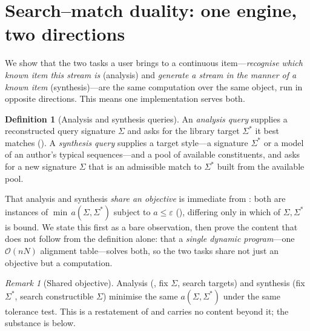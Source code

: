 \documentclass[11pt,twocolumn,a4paper]{article}
\theoremstyle{thmstyle}
\theoremstyle{definition}
\newtheorem{definition}[theorem]{Definition}
\theoremstyle{remark}
\newtheorem{remark}[theorem]{Remark}
\newcommand{\sig}{\Sigma}
\newcommand{\algn}{a}
\newcommand{\eps}{\varepsilon}
\newcommand{\bigOh}{\mathcal{O}}
\begin{document}
\section{Search--match duality: one engine, two directions}
\label{sec:duality}

We show that the two tasks a user brings to a continuous item---\emph{recognise
which known item this stream is} (analysis) and \emph{generate a stream in the
manner of a known item} (synthesis)---are the same computation over the same
object, run in opposite directions. This means one implementation serves both.

\begin{definition}[Analysis and synthesis queries]
\label{def:queries}
An \emph{analysis query} supplies a reconstructed query signature $\sig$ and asks
for the library target $\sig^{\ast}$ it best matches ().
A \emph{synthesis query} supplies a target style---a signature $\sig^{\ast}$ or a
model of an author's typical sequences---and a pool of available constituents,
and asks for a new signature $\sig$ that is an admissible match to $\sig^{\ast}$
built from the available pool.
\end{definition}

That analysis and synthesis \emph{share an objective} is immediate from
: both are instances of $\min\,\algn(\sig,\sig^{\ast})$
subject to $\algn\le\eps$ (), differing only in which of
$\sig,\sig^{\ast}$ is bound. We state this first as a bare observation, then
prove the content that does not follow from the definition alone: that a
\emph{single dynamic program}---one $\bigOh(nN)$ alignment table---solves both,
so the two tasks share not just an objective but a computation.

\begin{remark}[Shared objective]
\label{rem:shared-objective}
Analysis (, fix $\sig$, search targets) and synthesis (fix
$\sig^{\ast}$, search constructible $\sig$) minimise the same
$\algn(\sig,\sig^{\ast})$ under the same tolerance test. This is a restatement of
 and carries no content beyond it; the substance is
 below.
\end{remark}
\end{document}

